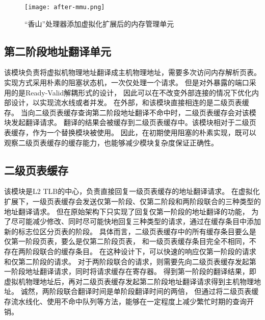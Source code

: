 \begin{figure}[htbp]
\centering
\texttt{[image: after-mmu.png]}
\caption{“香山”处理器添加虚拟化扩展后的内存管理单元}
\label{fig:after-mmu}
\end{figure}

\subsection{第二阶段地址翻译单元}
该模块负责将虚拟机物理地址翻译成主机物理地址，需要多次访问内存解析页表。
实现方式采用朴素的阻塞状态机，一次仅处理一个请求。
但是对外暴露的端口采用的是Ready-Valid解耦形式的设计，
因此可以在不改变外部连接的情况下优化内部设计，以实现流水线或者并发。
在外部，和该模块直接相连的是二级页表缓存。
当向二级页表缓存查询第二阶段地址翻译不命中时，二级页表缓存会对该模块发起翻译请求。
翻译的结果会被缓存到二级页表缓存中。该模块相对于二级页表缓存，作为一个替换模块被使用。
因此，在初期使用阻塞的朴素实现，既可以观察二级页表缓存的缓存能力，也能够减少模块复杂度保证正确性。

\subsection{二级页表缓存}
该模块是L2 TLB的中心，负责直接回复一级页表缓存的地址翻译请求。
在虚拟化扩展下，一级页表缓存会发送仅第一阶段、仅第二阶段和两阶段联合的三种类型的地址翻译请求。
但在原始架构下只实现了回复仅第一阶段的地址翻译的功能，
为了尽可能减少修改、同时尽可能快地回复三种类型的请求，通过在缓存条目中添加新的标志位区分页表的阶段。
具体而言，二级页表缓存中的所有缓存条目要么是仅第一阶段页表，要么是仅第二阶段页表，
和一级页表缓存条目完全不相同，不存在两阶段联合的缓存条目。
在这种设计下，可以快速的响应仅第一阶段的请求和仅第二阶段的请求。
对于两阶段联合的请求，则需要先向二级页表缓存发起第一阶段地址翻译请求，同时将请求缓存在寄存器。
得到第一阶段的翻译结果，即虚拟机物理地址后，再对二级页表缓存发起第二阶段地址翻译请求得到主机物理地址。
诚然，两阶段联合翻译时间是单阶段翻译时间的两倍，
但通过将二级页表缓存流水线化、使用不命中队列等方法，能够在一定程度上减少繁忙时期的查询开销。


